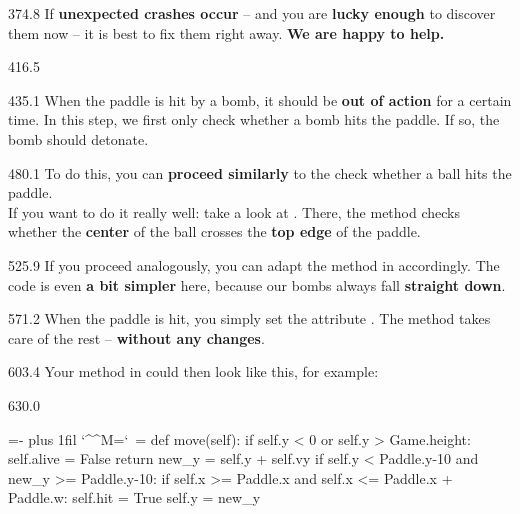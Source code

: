\documentclass{aslab}
\makeatletter
\newcommand*\kw[1]{\textcolor{codeorange}{#1}}
\newcommand*\fn[1]{\textcolor{codecyan}{#1}}
\newcommand*\num[1]{\textcolor{codered}{#1}}
\newenvironment{pycode}{\par\ttfamily\hyphenchar\font=-1
  \lineskiplimit=-\maxdimen\lineskip=0pt\parindent=0pt
  \parfillskip=0pt plus 1fil\relax
  \catcode`\^^M=\active\catcode`\ =\active\py@setup\py@gobble}{}
\makeatother
\begin{document}
\begin{region}[pitch=14.2]{374.8}
If \textbf{unexpected crashes occur} -- and you are \textbf{lucky enough} to
discover them now -- it is best to fix them right away. \textbf{We are happy
to help.}
\end{region}

\begin{region}{416.5}
\end{region}

\begin{region}[pitch=13.25]{435.1}
When the paddle is hit by a bomb, it should be \textbf{out of action} for a
certain time. In this step, we first only check whether a bomb hits the
paddle. If so, the bomb should detonate.
\end{region}

\begin{region}[pitch=13.9]{480.1}
To do this, you can \textbf{proceed similarly} to the check whether a ball
hits the paddle.\\
If you want to do it really well: take a look at . There, the
 method checks whether the \textbf{center} of the ball crosses the
\textbf{top edge} of the paddle.
\end{region}

\begin{region}[pitch=13.75]{525.9}
If you proceed analogously, you can adapt the  method in
 accordingly. The code is even \textbf{a bit simpler} here,
because our bombs always fall \textbf{straight down}.
\end{region}

\begin{region}[pitch=14.2]{571.2}
When the paddle is hit, you simply set the attribute .
The  method takes care of the rest -- \textbf{without any
changes}.
\end{region}

\begin{region}{603.4}
Your  method in  could then look like this, for
example:
\end{region}

\begin{region}[]{630.0}
\begin{pycode}
    \kw{def} \fn{move}(self):
        \kw{if} self.y < \num{0} \kw{or} self.y > Game.height:
            self.alive = \fn{False}
            \kw{return}
        new\_y = self.y + self.vy
        \kw{if} self.y < Paddle.y-\num{10} \kw{and} new\_y >= Paddle.y-\num{10}:
            \kw{if} self.x >= Paddle.x \kw{and} self.x <= Paddle.x + Paddle.w:
                self.hit = \fn{True}
        self.y = new\_y
\end{pycode}
\end{region}
\end{document}
